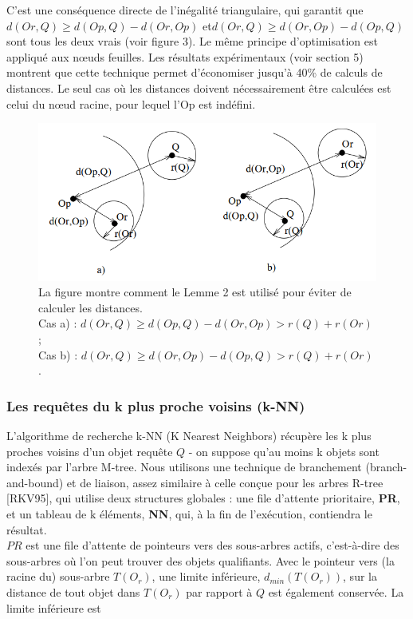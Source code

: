 C'est une conséquence directe de l'inégalité triangulaire, qui garantit que $ d(Or, Q) \ge d(Op, Q)-d(Or, Op) $ et$  d(Or, Q) \ge d(Or, Op)-d(Op, Q) $ sont tous les deux vrais (voir figure 3). Le même principe d'optimisation est appliqué aux nœuds feuilles. Les résultats expérimentaux (voir section 5) montrent que cette technique permet d'économiser jusqu'à 40\% de calculs de distances. Le seul cas où les distances doivent nécessairement être calculées est celui du nœud racine, pour lequel l'Op est indéfini.

\begin{figure}[H]
	\centering
	\includegraphics[width=.6 \textwidth]{Figures/lemme.png} %
	\caption{La figure montre comment le Lemme 2 est utilisé pour éviter de calculer les distances. \\Cas a) : $ d(Or, Q) \ge d(Op, Q) - d(Or, Op) > r(Q) + r(Or) $ ; \\
		Cas b) : $ d(Or, Q) \ge d(Or, Op) - d(Op, Q) > r(Q) + r(Or) $.}
\end{figure} 

\subsubsection{Les requêtes du k plus proche voisins (k-NN)}

L'algorithme de recherche k-NN (K Nearest Neighbors) récupère les k plus proches voisins d'un objet requête $ Q $ - on suppose qu'au moins k objets sont indexés par l'arbre M-tree. Nous utilisons une technique de branchement (branch-and-bound) et de liaison, assez similaire à celle conçue pour les arbres R-tree [RKV95], qui utilise deux structures globales : une file d'attente prioritaire, \textbf{PR}, et un tableau de k éléments, \textbf{NN}, qui, à la fin de l'exécution, contiendra le résultat.\\

$ PR $ est une file d'attente de pointeurs vers des sous-arbres actifs, c'est-à-dire des sous-arbres où l'on peut trouver des objets qualifiants. Avec le pointeur vers (la racine du) sous-arbre $ T (O_r) $, une limite inférieure, $ d_{min}(T (O_r)) $, sur la distance de tout objet dans $ T (O_r) $ par rapport à $ Q $ est également conservée. La limite inférieure est

